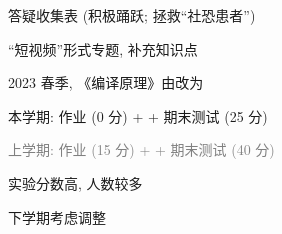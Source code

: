 
\begin{frame}{}
  \begin{center}
     答疑收集表 (积极踊跃; 拯救``社恐患者'')
  \end{center}
\end{frame}


\begin{frame}{}
  \begin{center}
     ``短视频''形式专题, 补充知识点
  \end{center}
\end{frame}

\begin{frame}{}
  \begin{center}
    2023 春季, 《编译原理》由改为

    \vspace{0.30cm}
  \end{center}
\end{frame}

\begin{frame}{}
  \begin{center}
    本学期: {作业 (0 分) +  + 期末测试 (25 分)}

    \vspace{0.80cm}

    \textcolor{gray}{上学期: {作业 (15 分) +  + 期末测试 (40 分)}}

    \vspace{1.50cm}
    实验分数高, 人数较多

    \vspace{0.60cm}
    下学期考虑调整
  \end{center}
\end{frame}

